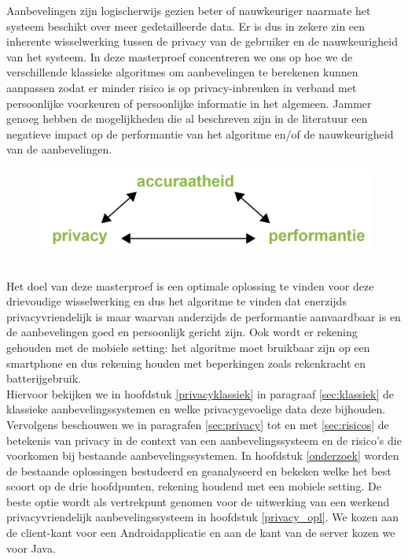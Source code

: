 Aanbevelingen zijn logischerwijs gezien beter of nauwkeuriger naarmate het systeem beschikt over meer gedetailleerde data. Er is dus in zekere zin een inherente wisselwerking tussen de privacy van de gebruiker en de nauwkeurigheid van het systeem. In deze masterproef concentreren we ons op hoe we de verschillende klassieke algoritmes om aanbevelingen te berekenen kunnen aanpassen zodat er minder risico is op privacy-inbreuken in verband met persoonlijke voorkeuren of persoonlijke informatie in het algemeen. Jammer genoeg hebben de mogelijkheden die al beschreven zijn in de literatuur een negatieve impact op de performantie van het algoritme en/of de nauwkeurigheid van de aanbevelingen. 
\begin{figure}[htpb]   
    \label{Figuur::wisselwerking}      
  \begin{center}    
 \includegraphics[width=\textwidth,height=\textheight,keepaspectratio]{fig/wisselwerking}    
  \end{center}     
   \end{figure}\\
Het doel van deze masterproef is een optimale oplossing te vinden voor deze drievoudige wisselwerking en dus het algoritme te vinden dat enerzijds privacyvriendelijk is maar waarvan anderzijds de performantie aanvaardbaar is en de aanbevelingen goed en persoonlijk gericht zijn. Ook wordt er rekening gehouden met de mobiele setting: het algoritme moet bruikbaar zijn op een smartphone en dus rekening houden met beperkingen zoals rekenkracht en batterijgebruik.\\

Hiervoor bekijken we in hoofdstuk \ref{privacyklassiek} in paragraaf \ref{sec:klassiek} de klassieke aanbevelingssystemen en welke privacygevoelige data deze bijhouden. Vervolgens beschouwen we in paragrafen \ref{sec:privacy} tot en met \ref{sec:risicos} de betekenis van privacy in de context van een aanbevelingssysteem en de risico's die voorkomen bij bestaande aanbevelingssystemen. In hoofdstuk \ref{onderzoek} worden de bestaande oplossingen bestudeerd en geanalyseerd en bekeken welke het best scoort op de drie hoofdpunten, rekening houdend met een mobiele setting. De beste optie wordt als vertrekpunt genomen voor de uitwerking van een werkend privacyvriendelijk aanbevelingssysteem in hoofdstuk \ref{privacy_opl}. We kozen aan de client-kant voor een Androidapplicatie en aan de kant van de server kozen we voor Java.
 
